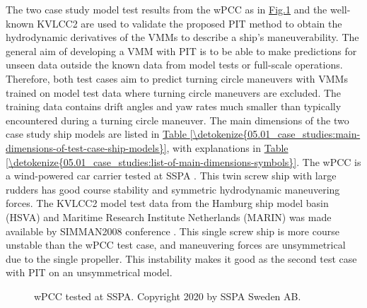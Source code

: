 \documentclass[review]{elsarticle}
\let\sphinxpxdimen\pdfpxdimen\else\newdimen\sphinxpxdimen
\begin{document}
The two case study model test results from the wPCC as in \hyperref[\detokenize{05.01_case_studies:wpcc-mdl}]{Fig.\@ \ref{\detokenize{05.01_case_studies:wpcc-mdl}}} and the well-known KVLCC2 are used to validate the proposed PIT method to obtain the hydrodynamic derivatives of the VMMs to describe a ship’s maneuverability. The general aim of developing a VMM with PIT is to be able to make predictions for unseen data outside the known data from model tests or full-scale operations. Therefore, both test cases aim to predict turning circle maneuvers with VMMs trained on model test data where turning circle maneuvers are excluded. The training data contains drift angles and yaw rates much smaller than typically encountered during a turning circle maneuver.
The main dimensions of the two case study ship models are listed in \hyperref[\detokenize{05.01_case_studies:main-dimensions-of-test-case-ship-models}]{Table \ref{\detokenize{05.01_case_studies:main-dimensions-of-test-case-ship-models}}}, with explanations in \hyperref[\detokenize{05.01_case_studies:list-of-main-dimensions-symbols}]{Table \ref{\detokenize{05.01_case_studies:list-of-main-dimensions-symbols}}}. The wPCC is a wind-powered car carrier tested at SSPA \cite{alexandersson_wpcc_2022}. This twin screw ship with large rudders has good course stability and symmetric hydrodynamic maneuvering forces. The KVLCC2 model test data from the Hamburg ship model basin (HSVA) and Maritime Research Institute Netherlands (MARIN) was made available by SIMMAN2008 conference \cite{stern_experience_2011}. This single screw ship is more course unstable than the wPCC test case, and maneuvering forces are unsymmetrical due to the single propeller. This instability makes it good as the second test case with PIT on an unsymmetrical model.

 \begin{figure}[H]
 \centering
 \capstart

 \noindent\sphinxincludegraphics[height=150\sphinxpxdimen]{{wpcc_mdl}.png}
\caption{wPCC tested at SSPA. Copyright 2020 by SSPA Sweden AB.}\label{\detokenize{05.01_case_studies:wpcc-mdl}}\end{figure}
\end{document}
